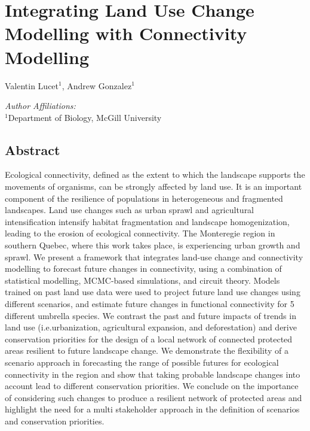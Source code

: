 \chapter{Integrating Land Use Change Modelling with Connectivity Modelling}
\begin{center}
{Valentin Lucet$^{1}$, Andrew Gonzalez$^{1}$}\\
\end{center}
\textit{Author Affiliations:}\\
\normalsize{$^{1}$Department of Biology, McGill University}\\
\section{Abstract}

Ecological connectivity, defined as the extent to which the landscape supports the movements of organisms, can be strongly affected by land use. It is an important component of the resilience of populations in heterogeneous and fragmented landscapes. Land use changes such as urban sprawl and agricultural intensification intensify habitat fragmentation and landscape homogenization, leading to the erosion of ecological connectivity. The Monteregie region in southern Quebec, where this work takes place, is experiencing urban growth and sprawl. We present a framework that integrates land-use change and connectivity modelling to forecast future changes in connectivity, using a combination of statistical modelling, MCMC-based simulations, and circuit theory. Models trained on past land use data were used to project future land use changes using different scenarios, and estimate future changes in functional connectivity for 5 different umbrella species. We contrast the past and future impacts of trends in land use (i.e.urbanization, agricultural expansion, and deforestation) and derive conservation priorities for the design of a local network of connected protected areas resilient to future landscape change. We demonstrate the flexibility of a scenario approach in forecasting the range of possible futures for ecological connectivity in the region and show that taking probable landscape changes into account lead to different conservation priorities. We conclude on the importance of considering such changes to produce a resilient network of protected areas and highlight the need for a multi stakeholder approach in the definition of scenarios and conservation priorities.\\

